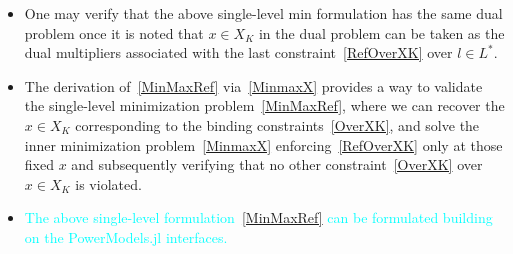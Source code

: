 \documentclass[xcolor=dvipsnames]{beamer}
\newcommand{\red}[1]{\textcolor{BrickRed}{#1}}
\newcommand{\blue}[1]{\textcolor{Cyan}{#1}}
\begin{document}
\begin{frame}

\begin{itemize}
\item One may verify that the above single-level min formulation has the same dual problem once it is noted that $x \in X_K$ in the dual problem can be taken as the dual multipliers associated with the last constraint~\eqref{RefOverXK} over $l \in L^*$. 
\item \red{The derivation of~\eqref{MinMaxRef} via~\eqref{MinmaxX} provides a way to validate the single-level minimization problem~\eqref{MinMaxRef}, where we can recover the $x \in X_K$ corresponding to the binding constraints~\eqref{OverXK}, and solve the inner minimization problem~\eqref{MinmaxX} enforcing~\eqref{RefOverXK} only at those fixed $x$ and subsequently verifying that no other constraint~\eqref{OverXK} over $x \in X_K$ is violated.}
\item \blue{The above single-level formulation~\eqref{MinMaxRef} can be formulated building on the PowerModels.jl interfaces.}
\end{itemize}
\end{frame}
\end{document}
